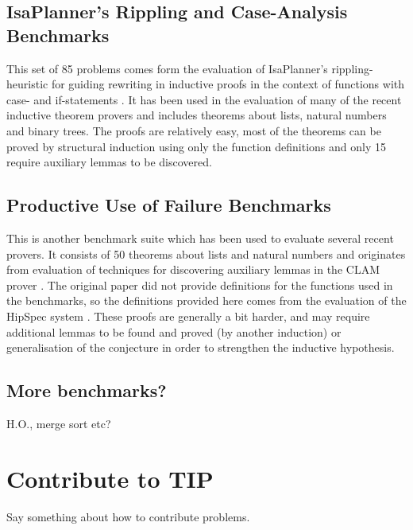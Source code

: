\documentclass{llncs}
\begin{document}
\subsection{IsaPlanner's Rippling and Case-Analysis Benchmarks}
\label{sec:isap}
This set of 85 problems comes form the evaluation of IsaPlanner's rippling-heuristic for guiding rewriting in inductive proofs in the context of functions with case- and if-statements \cite{IsaPcase}. It has been used in the evaluation of many of the recent inductive theorem provers and includes theorems about lists, natural numbers and binary trees. The proofs are relatively easy, most of the theorems can be proved by structural induction using only the function definitions and only 15 require auxiliary lemmas to be discovered.

\subsection{Productive Use of Failure Benchmarks}
This is another benchmark suite which has been used to evaluate several recent provers. It consists of 50 theorems about lists and natural numbers and originates from evaluation of techniques for discovering auxiliary lemmas in the CLAM prover \cite{productiveuse}. The original paper did not provide definitions for the functions used in the benchmarks, so the definitions provided here comes from the evaluation of the HipSpec system \cite{hipspecCADE}. These proofs are generally a bit harder, and may require additional lemmas to be found and proved (by another induction) or generalisation of the conjecture in order to strengthen the inductive hypothesis. 

\subsection{More benchmarks?}
H.O., merge sort etc?

%
%
%
%

\section{Contribute to TIP}
Say something about how to contribute problems. 
\end{document}
